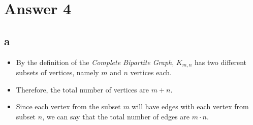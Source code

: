 \documentclass[11pt]{article}
\begin{document}
\section*{Answer 4}
\subsection*{a}
\begin{itemize}
    \item By the definition of the \textit{Complete Bipartite Graph}, $K_{m,n}$ has two different subsets of vertices, namely $m$ and $n$ vertices each.
    \item Therefore, the total number of vertices are $m+n$.
    \item Since each vertex from the subset $m$ will have edges with each vertex from subset $n$, we can say that the total number of edges are $m \cdot n$.
\end{itemize}
\end{document}
